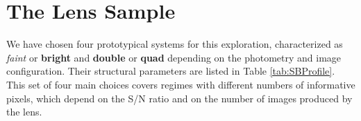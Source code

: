 \documentclass[a4paper,11pt]{article}
\begin{document}


\section{The Lens Sample}

We have chosen four prototypical systems for this exploration, characterized as \textit{faint} or \textbf{bright} and \textbf{double} or \textbf{quad} depending on the photometry and image configuration. Their structural parameters are listed in Table \ref{tab:SBProfile}. This set of four main choices covers regimes with different numbers of informative pixels, which depend on the S/N ratio and on the number of images produced by the lens.
\end{document}
